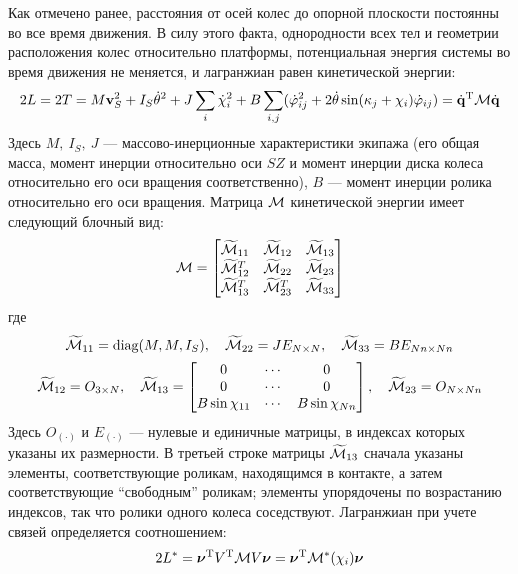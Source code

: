 Как отмечено ранее, расстояния от осей колес до опорной плоскости постоянны во все время движения. В силу этого факта, однородности всех тел и геометрии расположения колес относительно платформы, потенциальная энергия системы во время движения не меняется, и лагранжиан равен кинетической энергии:
\begin{equation}\label{kin_en}
    2L = 2T = M\boldsymbol{\mathbf{v}}_S^2 + I_S\dot{\theta}^2 + J\sum_i\dot{\chi}_i^2 + B\sum_{i,j}(\dot{\varphi}_{ij}^2 + 2\dot{\theta}\sin(\kappa_j + \chi_i)\dot{\varphi}_{ij})=\dot{\boldsymbol{\mathbf{q}}}^\mathrm{T}\mathcal{M}\dot{\boldsymbol{\mathbf{q}}}
\end{equation}
Здесь $M,\ I_S,\ J$ --- массово-инерционные характеристики экипажа (его общая масса, момент инерции относительно оси $SZ$ и момент инерции диска колеса относительно его оси вращения соответственно), $B$ --- момент инерции ролика относительно его оси вращения. Матрица $\mathcal{M}$ кинетической энергии имеет следующий блочный вид:
$$
\mathcal{M} = \begin{bmatrix}
    \widetilde{\mathcal{M}}_{11}   & \widetilde{\mathcal{M}}_{12}   & \widetilde{\mathcal{M}}_{13} \\
    \widetilde{\mathcal{M}}_{12}^T & \widetilde{\mathcal{M}}_{22}   & \widetilde{\mathcal{M}}_{23} \\
    \widetilde{\mathcal{M}}_{13}^T & \widetilde{\mathcal{M}}_{23}^T & \widetilde{\mathcal{M}}_{33} \\
\end{bmatrix}
$$
где
$$
\widetilde{\mathcal{M}}_{11} = \text{diag}(M, M, I_S),
\quad
\widetilde{\mathcal{M}}_{22} = JE_{N \times N},
\quad
\widetilde{\mathcal{M}}_{33} = BE_{Nn \times Nn}
$$
$$
\widetilde{\M}_{12} = O_{3 \times N},
\quad
\widetilde{\M}_{13} = \begin{bmatrix}
        0                      & \cdots & 0                      \\
        0                      & \cdots & 0                      \\
        B\sin\chi_{11}         & \cdots & B\sin\chi_{Nn}         \\
    \end{bmatrix},
\quad
\widetilde{\M}_{23} = O_{N \times Nn}
\vsp
$$
Здесь $O_{(\boldsymbol{\cdot})}$ и $E_{(\boldsymbol{\cdot})}$ --- нулевые и единичные матрицы, в индексах которых указаны их размерности. В третьей строке матрицы $\widetilde{\mathcal{M}}_{13}$ сначала указаны элементы, соответствующие роликам, находящимся в контакте, а затем соответствующие ``свободным'' роликам; элементы упорядочены по возрастанию индексов, так что ролики одного колеса соседствуют. Лагранжиан при учете связей определяется соотношением:
$$ 2L^{*}  = \boldsymbol{\mathbf{\nu}}^\mathrm{T} V^\mathrm{T}\mathcal{M} V\boldsymbol{\mathbf{\nu}} = \boldsymbol{\mathbf{\nu}}^\mathrm{T} \mathcal{M}^*(\chi_i)\boldsymbol{\mathbf{\nu}} $$

